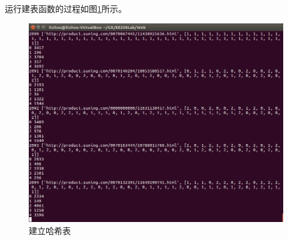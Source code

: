 运行建表函数的过程如图\ref{fig:makehash}所示。

\begin{figure}[htbp]
\centering
\includegraphics[width=13.5cm]{img/zlt/makehash.png}
\caption{建立哈希表}
\label{fig:makehash}   %
\end{figure}